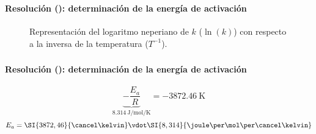 \begin{frame}
	\frametitle{\ejerciciocmd}
	\framesubtitle{Resolución (): determinación de la energía de activación}
	\begin{center}
		\begin{figure}
			\caption{Representación del logaritmo neperiano de $k$ ($\ln(k)$) con respecto a la inversa de la temperatura ($T^{-1}$).}
			
		\end{figure}
	\end{center}
\end{frame}

\begin{frame}
	\frametitle{\ejerciciocmd}
	\framesubtitle{Resolución (): determinación de la energía de activación}
	$$
		\underbrace{-\frac{E_a}{R}}_{\SI{8,314}{\joule\per\mol\per\kelvin}}=\SI{-3872,46}{\kelvin}
	$$
	$$
		E_a=\SI{3872,46}{\cancel\kelvin}\vdot\SI{8,314}{\joule\per\mol\per\cancel\kelvin}
	$$
	\begin{center}
	\end{center}
\end{frame}
